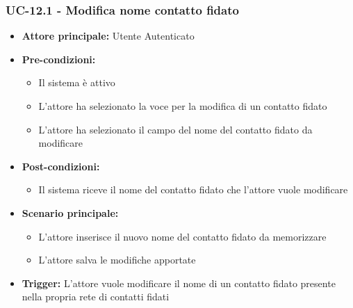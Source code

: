 \documentclass[a4paper,12pt]{article}
\begin{document}
\subsubsection{UC-12.1 - Modifica nome contatto fidato} \label{subsec:UC-12.1}
\begin{itemize}
    \item \textbf{Attore principale:} Utente Autenticato
    \item \textbf{Pre-condizioni:}
    \begin{itemize}
        \item Il sistema è attivo
        \item L'attore ha selezionato la voce per la modifica di un contatto fidato
        \item L'attore ha selezionato il campo del nome del contatto fidato da modificare
    \end{itemize}
    \item \textbf{Post-condizioni:} 
    \begin{itemize}
        \item Il sistema riceve il nome del contatto fidato che l'attore vuole modificare
    \end{itemize}
    \item \textbf{Scenario principale:} 
    \begin{itemize}
        \item L'attore inserisce il nuovo nome del contatto fidato da memorizzare
        \item L'attore salva le modifiche apportate
    \end{itemize}
    \item \textbf{Trigger:} L'attore vuole modificare il nome di un contatto fidato presente nella propria rete di contatti fidati
\end{itemize}
\end{document}
